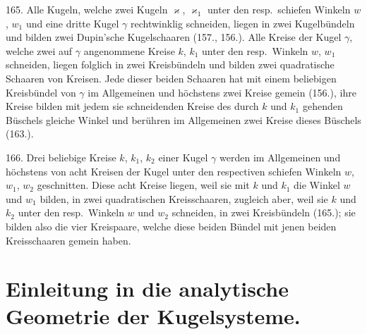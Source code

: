 165. Alle Kugeln, welche zwei Kugeln $\varkappa$, $\varkappa_1$ unter den
resp.\ schiefen Winkeln $w$, $w_1$ und eine dritte Kugel $\gamma$ rechtwinklig
schneiden, liegen in zwei Kugelb\"undeln und bilden
zwei Dupin'sche Kugelschaaren (157., 156.). Alle Kreise
der Kugel $\gamma$, welche zwei auf $\gamma$ angenommene Kreise $k$, $k_1$
unter den resp.\ Winkeln $w$, $w_1$ schneiden, liegen folglich in
zwei Kreisb\"undeln und bilden zwei quadratische Schaaren
von Kreisen. Jede dieser beiden Schaaren hat mit einem
beliebigen Kreisb\"undel von $\gamma$ im Allgemeinen und h\"ochstens
zwei Kreise gemein (156.), ihre Kreise bilden mit jedem
sie schneidenden Kreise des durch $k$ und $k_1$ gehenden B\"uschels
gleiche Winkel und ber\"uhren im Allgemeinen zwei
Kreise dieses B\"uschels (163.).

166. Drei beliebige Kreise $k$, $k_1$, $k_2$ einer Kugel $\gamma$ werden
im Allgemeinen und h\"ochstens von acht Kreisen der Kugel
unter den respectiven schiefen Winkeln $w$, $w_1$, $w_2$ geschnitten.
Diese acht Kreise liegen, weil sie mit $k$ und $k_1$ die
Winkel $w$ und $w_1$ bilden, in zwei quadratischen Kreisschaaren,
zugleich aber, weil sie $k$ und $k_2$ unter den resp.\ Winkeln
$w$ und $w_2$ schneiden, in zwei Kreisb\"undeln (165.);
sie bilden also die vier Kreispaare, welche diese beiden
B\"undel mit jenen beiden Kreisschaaren gemein haben.

\begin{center}
\makebox[15em]{\hrulefill}
\end{center}
\newpage

\section*{\centering Einleitung in die analytische Geometrie der Kugelsysteme.}

\label{p19}


